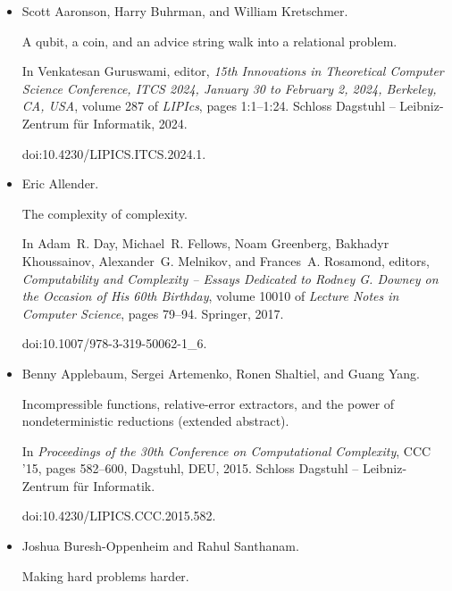 \begin{itemize}


\item[] 
[1]

Scott Aaronson, Harry Buhrman, and William Kretschmer.


A qubit, a coin, and an advice string walk into a relational problem.


In Venkatesan Guruswami, editor, \emph{15th Innovations in Theoretical
Computer Science Conference, ITCS 2024, January 30 to February 2, 2024,
Berkeley, CA, USA}, volume 287 of \emph{LIPIcs}, pages 1:1–1:24. Schloss
Dagstuhl – Leibniz-Zentrum für Informatik, 2024.


doi:10.4230/LIPICS.ITCS.2024.1.





\item[] 
[2]

Eric Allender.


The complexity of complexity.


In Adam R. Day, Michael R. Fellows, Noam Greenberg, Bakhadyr
Khoussainov, Alexander G. Melnikov, and Frances A. Rosamond, editors, \emph{Computability and Complexity – Essays Dedicated to Rodney G. Downey on the
Occasion of His 60th Birthday}, volume 10010 of \emph{Lecture Notes in
Computer Science}, pages 79–94. Springer, 2017.


doi:10.1007/978-3-319-50062-1\_6.





\item[] 
[3]

Benny Applebaum, Sergei Artemenko, Ronen Shaltiel, and Guang Yang.


Incompressible functions, relative-error extractors, and the power of
nondeterministic reductions (extended abstract).


In \emph{Proceedings of the 30th Conference on Computational
Complexity}, CCC ’15, pages 582–600, Dagstuhl, DEU, 2015. Schloss Dagstuhl
– Leibniz-Zentrum für Informatik.


doi:10.4230/LIPICS.CCC.2015.582.





\item[] 
[4]

Joshua Buresh-Oppenheim and Rahul Santhanam.


Making hard problems harder.



\end{itemize}
